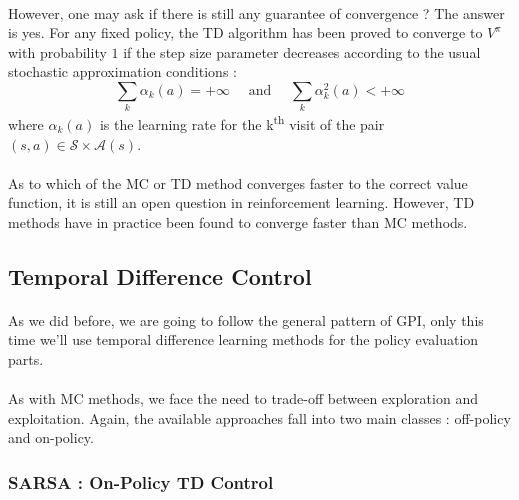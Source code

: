 \documentclass[a4paper]{article}
\begin{document}
{{{{				\paragraph{} However, one may ask if there is still any guarantee of convergence ? The answer is yes. For any fixed policy, the TD algorithm has been proved to converge to $V^\pi$ with probability $1$ if the step size parameter decreases according to the usual stochastic approximation conditions : 
				\begin{equation}
					\sum_k\alpha_k(a)  = +\infty \quad \text{ and } \quad \sum_k\alpha_k^2(a) < + \infty
				\end{equation}
				where $\alpha_k(a)$ is the learning rate for the k\textsuperscript{th} visit of the pair $(s,a)\in\mathcal{S}\times\mathcal{A}(s)$. 
				
				\paragraph{} As to which of the MC or TD method converges faster to the correct value function, it is still an open question in reinforcement learning. However, TD methods have in practice been found to converge faster than MC methods. 
			}
			}
			
			\subsection{Temporal Difference Control}
			{
					\paragraph{} As we did before, we are going to follow the general pattern of GPI, only this time we'll use temporal difference learning methods for the policy evaluation parts. 
					
					\paragraph{} As with MC methods, we face the need to trade-off between exploration and exploitation. Again, the available approaches fall into two main classes : off-policy and on-policy. 
				\subsubsection{SARSA : On-Policy TD Control}
				{
}}}}
\end{document}

